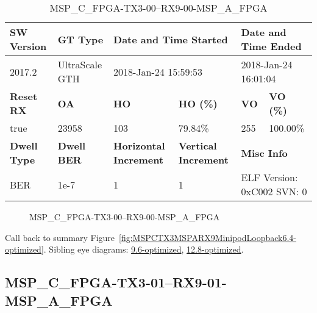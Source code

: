 \begin{table}[h]
\centering
\caption{MSP\_C\_FPGA-TX3-00--RX9-00-MSP\_A\_FPGA}
\label{tab:MSPCFPGATX300RX900MSPAFPGA6.4-optimized}
\begin{tabular}{@{}|l|l|l|l|l|l|@{}}
\toprule
\textbf{SW Version}                & \textbf{GT Type}   & \multicolumn{2}{l|}{\textbf{Date and Time Started}}            & \multicolumn{2}{l|}{\textbf{Date and Time Ended}}        \\ \midrule
2017.2                       & UltraScale GTH          & \multicolumn{2}{l|}{2018-Jan-24 15:59:53}                   & \multicolumn{2}{l|}{2018-Jan-24 16:01:04}               \\ \midrule
\textbf{Reset RX}                  & \textbf{OA} & \textbf{HO}   & \textbf{HO (\%)} & \textbf{VO} & \textbf{VO (\%)} \\ \midrule
true & 23958        & 103          & 79.84\%        & 255        & 100.00\%       \\ \midrule
\textbf{Dwell Type}                & \textbf{Dwell BER} & \textbf{Horizontal Increment} & \textbf{Vertical Increment}    & \multicolumn{2}{l|}{\textbf{Misc Info}}                  \\ \midrule
BER                            & 1e-7        & 1        & 1           & \multicolumn{2}{l|}{ELF Version: 0xC002 SVN: 0}                         \\ \bottomrule
\end{tabular}
\end{table}

\begin{figure}[h]
\caption{MSP\_C\_FPGA-TX3-00--RX9-00-MSP\_A\_FPGA} \label{fig:MSPCFPGATX300RX900MSPAFPGA6.4-optimized}
\end{figure}

Call back to summary Figure~\ref{fig:MSPCTX3MSPARX9MinipodLoopback6.4-optimized}.
Sibling eye diagrams: \hyperref[sec:MSPCFPGATX300RX900MSPAFPGA9.6-optimized]{9.6-optimized}, \hyperref[sec:MSPCFPGATX300RX900MSPAFPGA12.8-optimized]{12.8-optimized}.

\clearpage
\newpage


\subsection{MSP\_C\_FPGA-TX3-01--RX9-01-MSP\_A\_FPGA}\label{sec:MSPCFPGATX301RX901MSPAFPGA6.4-optimized}

